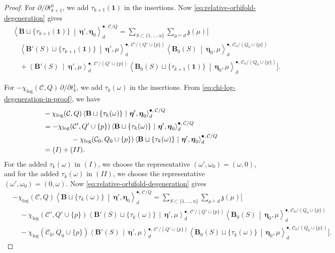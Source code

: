 \documentclass[letterpaper,12pt]{amsart}
\theoremstyle{definition}
\newcommand{\id}{\mathbf 1}
\newcommand{\cC}{\mathcal C}
\numberwithin{equation}{section}
\begin{document}
\begin{proof}
For \(\partial/\partial t^0_{k+1}\), we add
\(\tau_{k+1}(\id)\) in the insertions. Now \eqref{eq:relative-orbifold-degeneration} gives
\[
\begin{aligned}
&\left\langle\mathbf B\sqcup\{\tau_{k+1}(\id)\}
 \ \middle|\ \boldsymbol\eta',\boldsymbol\eta_0\right\rangle_d^{\bullet,\,\cC/Q}
={}\sum_{S\subset\{1,\ldots,u\}}\sum_{\mu\vdash d}\mathfrak z(\mu)\Bigg[
\\[-2mm]
&\quad\left\langle\mathbf B'(S)\sqcup\{\tau_{k+1}(\id)\}
 \ \middle|\ \boldsymbol\eta',\mu\right\rangle_d^{\bullet,\,\cC'/(Q'\cup\{p\})}
 \left\langle\mathbf B_0(S)\ \middle|\ \boldsymbol\eta_0,\mu\right\rangle_d^{\bullet,\,\cC_0/(Q_0\cup\{p\})}
\\[-1mm]
&\quad+\left\langle\mathbf B'(S)\ \middle|\ \boldsymbol\eta',\mu\right\rangle_d^{\bullet,\,\cC'/(Q'\cup\{p\})}
 \left\langle\mathbf B_0(S)\sqcup\{\tau_{k+1}(\id)\}
 \ \middle|\ \boldsymbol\eta_0,\mu\right\rangle_d^{\bullet,\,\cC_0/(Q_0\cup\{p\})}\Bigg].
\end{aligned}
\]

For \(-\chi_{\log}(\cC,Q)\,\partial/\partial t^1_k\), we add
\(\tau_k(\omega)\) in the insertions. From \eqref{eq:chi-log-degeneration-in-proof}, we have
\begin{align*}
 &-\chi_{\log}(\cC,Q)
 \left\langle\mathbf B\sqcup\{\tau_k(\omega)\}
 \ \middle|\ \boldsymbol\eta',\boldsymbol\eta_0\right\rangle_d^{\bullet,\,\cC/Q}\\
 &=
 -\chi_{\log}(\cC',Q'\cup\{p\})
 \left\langle\mathbf B\sqcup\{\tau_k(\omega)\}
 \ \middle|\ \boldsymbol\eta',\boldsymbol\eta_0\right\rangle_d^{\bullet,\,\cC/Q}\\
 &\hspace*{14mm}-\chi_{\log}(\cC_0,Q_0\cup\{p\})
 \left\langle\mathbf B\sqcup\{\tau_k(\omega)\}
 \ \middle|\ \boldsymbol\eta',\boldsymbol\eta_0\right\rangle_d^{\bullet,\,\cC/Q}\\
 &=(I)+(II).
\end{align*}
For the added $\tau_k(\omega)$ in $(I)$, we choose the representative $(\omega',\omega_0)=(\omega,0)$, and for the added $\tau_k(\omega)$ in $(II)$, we choose the representative $(\omega',\omega_0)=(0,\omega)$. Now \eqref{eq:relative-orbifold-degeneration} gives
\[
\begin{aligned}
&-\chi_{\log}(\cC,Q)
 \left\langle\mathbf B\sqcup\{\tau_k(\omega)\}
 \ \middle|\ \boldsymbol\eta',\boldsymbol\eta_0\right\rangle_d^{\bullet,\,\cC/Q}
={}\sum_{S\subset\{1,\ldots,u\}}\sum_{\mu\vdash d}\mathfrak z(\mu)\Bigg[
\\[-2mm]
&\quad-\chi_{\log}(\cC',Q'\cup\{p\})
 \left\langle\mathbf B'(S)\sqcup\{\tau_k(\omega)\}
 \,\middle|\,\boldsymbol\eta',\mu\right\rangle_d^{\bullet,\,\cC'/(Q'\cup\{p\})}
 \left\langle\mathbf B_0(S)\,\middle|\,\boldsymbol\eta_0,\mu\right\rangle_d^{\bullet,\,\cC_0/(Q_0\cup\{p\})}
\\[-1mm]
&\quad-\chi_{\log}(\cC_0,Q_0\cup\{p\})
 \left\langle\mathbf B'(S)\,\middle|\,\boldsymbol\eta',\mu\right\rangle_d^{\bullet,\,\cC'/(Q'\cup\{p\})}
 \left\langle\mathbf B_0(S)\sqcup\{\tau_k(\omega)\}
 \,\middle|\,\boldsymbol\eta_0,\mu\right\rangle_d^{\bullet,\,\cC_0/(Q_0\cup\{p\})}\Bigg].
\end{aligned}
\]


\end{proof}
\end{document}
